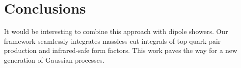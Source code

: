 \section{Conclusions}\label{sec:conclusions}

It would be interesting to combine this approach with dipole showers.
Our framework seamlessly integrates massless cut integrals of top-quark
pair production and infrared-safe form factors. This work paves the way
for a new generation of Gaussian processes.

